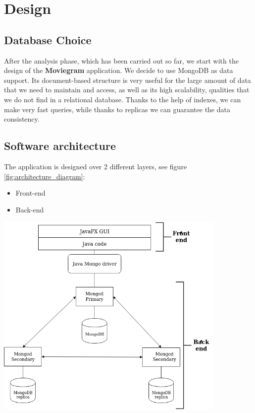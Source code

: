 \documentclass[a4paper, oneside]{article}
\begin{document}
\clearpage
\section{Design}

\subsection{Database Choice}
After the analysis phase, which has been carried out so far, we start with the design of the \textbf{Moviegram} application. We decide to use MongoDB as data support. Its document-based structure is very useful for the large amount of data that we need to maintain and access, as well as its high scalability, qualities that we do not find in a relational database. Thanks to the help of indexes, we can make very fast queries, while thanks to replicas we can guarantee the data consistency.

\subsection{Software architecture}
The application is designed over 2 different layers, see figure \ref{fig:architecture_diagram}:
\begin{itemize}
\item Front-end
\item Back-end
\end{itemize}
\vspace{5mm}
\begin{minipage}{\linewidth}
\begin{center}
\vspace{1mm}
\includegraphics[height = 100mm]{./images/diagrams/architecture_diagram.png} 
\vspace{6mm}
\label{fig:architecture_diagram}
\end{center}
\end{minipage}
\vspace{7mm}
\clearpage
\end{document}
